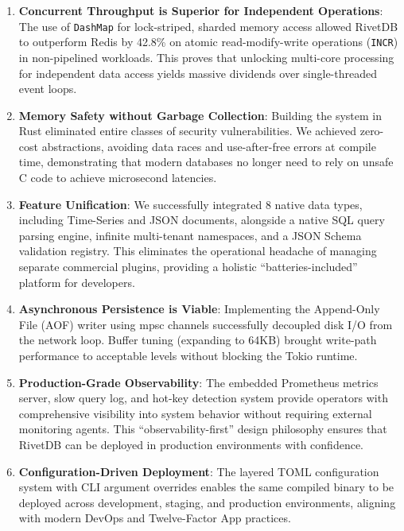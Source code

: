 \begin{enumerate}[leftmargin=2.5em]
    \item \textbf{Concurrent Throughput is Superior for Independent Operations}: The use of \texttt{DashMap} for lock-striped, sharded memory access allowed RivetDB to outperform Redis by 42.8\% on atomic read-modify-write operations (\texttt{INCR}) in non-pipelined workloads. This proves that unlocking multi-core processing for independent data access yields massive dividends over single-threaded event loops.
    
    \item \textbf{Memory Safety without Garbage Collection}: Building the system in Rust eliminated entire classes of security vulnerabilities. We achieved zero-cost abstractions, avoiding data races and use-after-free errors at compile time, demonstrating that modern databases no longer need to rely on unsafe C code to achieve microsecond latencies.
    
    \item \textbf{Feature Unification}: We successfully integrated 8 native data types, including Time-Series and JSON documents, alongside a native SQL query parsing engine, infinite multi-tenant namespaces, and a JSON Schema validation registry. This eliminates the operational headache of managing separate commercial plugins, providing a holistic ``batteries-included'' platform for developers.
    
    \item \textbf{Asynchronous Persistence is Viable}: Implementing the Append-Only File (AOF) writer using mpsc channels successfully decoupled disk I/O from the network loop. Buffer tuning (expanding to 64KB) brought write-path performance to acceptable levels without blocking the Tokio runtime.
    
    \item \textbf{Production-Grade Observability}: The embedded Prometheus metrics server, slow query log, and hot-key detection system provide operators with comprehensive visibility into system behavior without requiring external monitoring agents. This ``observability-first'' design philosophy ensures that RivetDB can be deployed in production environments with confidence.
    
    \item \textbf{Configuration-Driven Deployment}: The layered TOML configuration system with CLI argument overrides enables the same compiled binary to be deployed across development, staging, and production environments, aligning with modern DevOps and Twelve-Factor App practices.
\end{enumerate}

